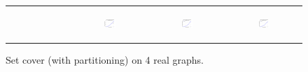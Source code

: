 \begin{figure}[ht]
\begin{tabular}{cccc}
\begin{subfigure}[b]{0.22\textwidth}
	  \end{subfigure} &
	  \begin{subfigure}[b]{0.22\textwidth}
	  	\includegraphics[width=110pt]{images_partition/validated_CC2G_arabic2005_setcover.png}
			\caption{}
			\label{appfig:partition:validated_CC2G_arabic2005_setcover}
	  \end{subfigure} &
	  \begin{subfigure}[b]{0.22\textwidth}
	  	\includegraphics[width=110pt]{images_partition/validated_CC2G_uk2005_setcover.png}
			\caption{}
			\label{appfig:partition:validated_CC2G_uk2005_setcover}
	  \end{subfigure} &
	  \begin{subfigure}[b]{0.22\textwidth}
	  	\includegraphics[width=110pt]{images_partition/validated_CC2G_it2004_setcover.png}
			\caption{}
			\label{appfig:partition:validated_CC2G_it2004_setcover}
	  \end{subfigure} \\
  \end{tabular}
  \caption{Set cover (with partitioning) on 4 real graphs.}
\end{figure}



